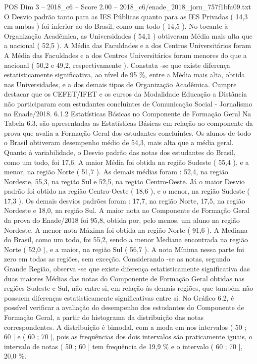 \begin{textsample}{POS Dim 3 – 2018\_c6 – Score 2.00 – 2018\_c6/enade\_2018\_jorn\_757f1bfa09.txt}
O Desvio padrão tanto para as IES Públicas quanto para as IES Privadas ( 14,3 em ambas ) foi inferior ao do Brasil, como um todo ( 14,5 ).
No tocante à Organização Acadêmica, as Universidades ( 54,1 ) obtiveram Média mais alta que a nacional ( 52,5 ).
A Média das Faculdades e a dos Centros Universitários foram A Média das Faculdades e a dos Centros Universitários foram menores do que a nacional ( 50,2 e 49,2, respectivamente ).
Constata -se que existe diferença estatisticamente significativa, ao nível de 95 \%, entre a Média mais alta, obtida nas Universidades, e a dos demais tipos de Organização Acadêmica.
Cumpre destacar que os CEFET/IFET e os cursos da Modalidade Educação a Distância não participaram com estudantes concluintes de Comunicação Social - Jornalismo no Enade/2018. 6.1.2 Estatísticas Básicas no Componente de Formação Geral Na Tabela 6.3, são apresentadas as Estatísticas Básicas em relação ao componente da prova que avalia a Formação Geral dos estudantes concluintes.
Os alunos de todo o Brasil obtiveram desempenho médio de 54,3, mais alta que a média geral.
Quanto à variabilidade, o Desvio padrão das notas dos estudantes do Brasil, como um todo, foi 17,6.
A maior Média foi obtida na região Sudeste ( 55,4 ), e a menor, na região Norte ( 51,7 ).
As demais médias foram : 52,4, na região Nordeste, 55,3, na região Sul e 52,5, na região Centro-Oeste.
Já o maior Desvio padrão foi obtido na região Centro-Oeste ( 18,6 ), e o menor, na região Sudeste ( 17,3 ).
Os demais desvios padrões foram : 17,7, na região Norte, 17,5, na região Nordeste e 18,0, na região Sul.
A maior nota no Componente de Formação Geral da prova do Enade/2018 foi 95,8, obtida por, pelo menos, um aluno na região Nordeste.
A menor nota Máxima foi obtida na região Norte ( 91,6 ).
A Mediana do Brasil, como um todo, foi 55,2, sendo a menor Mediana encontrada na região Norte ( 52,0 ), e a maior, na região Sul ( 56,7 ).
A nota Mínima nessa parte foi zero em todas as regiões, sem exceção.
Considerando -se as notas, segundo Grande Região, observa -se que existe diferença estatisticamente significativa das duas maiores Médias das notas do Componente de Formação Geral obtidas nas regiões Sudeste e Sul, não entre si, em relação às demais regiões, que também não possuem diferenças estatisticamente significativas entre si.
No Gráfico 6.2, é possível verificar a avaliação do desempenho dos estudantes do Componente de Formação Geral, a partir do histograma da distribuição das notas correspondentes.
A distribuição é bimodal, com a moda em nos intervalos ( 50 ; 60 ] e ( 60 ; 70 ], pois as frequências dos dois intervalos são praticamente iguais, o intervalo de notas ( 50 ; 60 ] tem frequência de 19,9 \% e o intervalo ( 60 ; 70 ], 20,0 \%.

\end{textsample}

